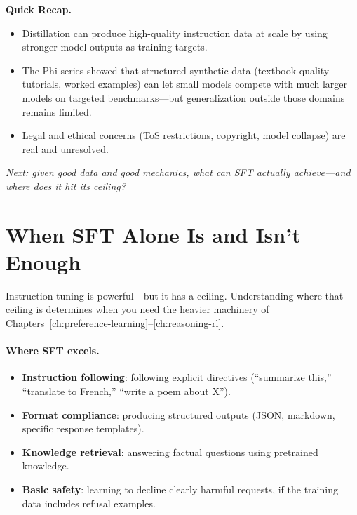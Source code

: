 \begin{quickrecap}
\textbf{Quick Recap.}
\begin{itemize}[nosep,leftmargin=1.5em]
  \item Distillation can produce high-quality instruction data at scale by using stronger model outputs as training targets.
  \item The Phi series showed that structured synthetic data (textbook-quality tutorials, worked examples) can let small models compete with much larger models on targeted benchmarks---but generalization outside those domains remains limited.
  \item Legal and ethical concerns (ToS restrictions, copyright, model collapse) are real and unresolved.
\end{itemize}
\textit{Next: given good data and good mechanics, what can SFT actually achieve---and where does it hit its ceiling?}
\end{quickrecap}



\section{When SFT Alone Is and Isn't Enough}
\label{sec:sft-limits}

Instruction tuning is powerful---but it has a ceiling. Understanding where that ceiling is determines when you need the heavier machinery of Chapters~\ref{ch:preference-learning}--\ref{ch:reasoning-rl}.

\paragraph{Where SFT excels.}

\begin{itemize}[nosep]
  \item \textbf{Instruction following}: following explicit directives (``summarize this,'' ``translate to French,'' ``write a poem about X'').
  \item \textbf{Format compliance}: producing structured outputs (JSON, markdown, specific response templates).
  \item \textbf{Knowledge retrieval}: answering factual questions using pretrained knowledge.
  \item \textbf{Basic safety}: learning to decline clearly harmful requests, if the training data includes refusal examples.
\end{itemize}

